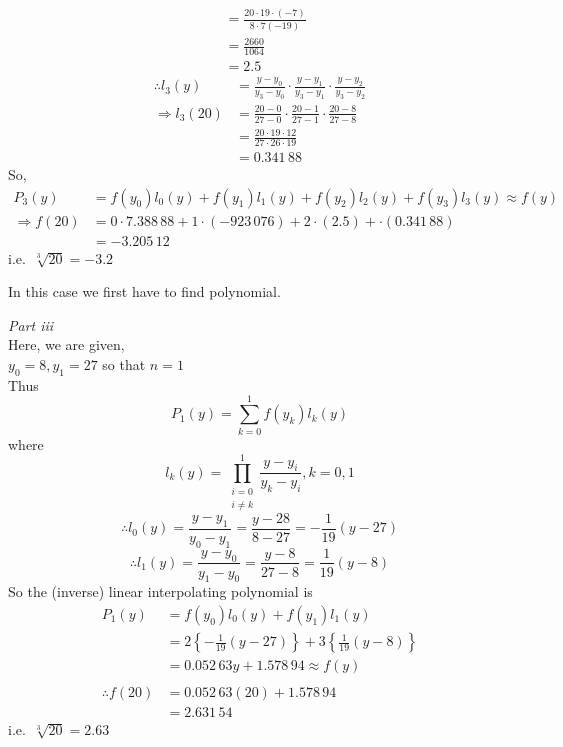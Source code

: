 \documentclass[12pt,class=book,crop=false]{standalone}
\begin{document}
\begin{soln}
\begin{align*}
                            & = \frac{20\cdot19\cdot(-7)}{8\cdot7(-19)}                                   \\
                            & =\frac{2660}{1064}                                                          \\
                            & =2.5
    \end{align*}
    \begin{align*}
        \therefore l_3(y)   & = \frac{y-y_0}{y_3-y_0}\cdot\frac{y-y_1}{y_3-y_1}\cdot\frac{y-y_2}{y_3-y_2} \\
        \Rightarrow l_3(20) & = \frac{20-0}{27-0}\cdot\frac{20-1}{27-1}\cdot\frac{20-8}{27-8}             \\
                            & = \frac{20\cdot19\cdot12}{27\cdot26\cdot19}                                 \\
                            & =0.341\,88
    \end{align*}
    So,
    \begin{align*}
        P_3(y)            & = f(y_0)l_0(y)+f(y_1)l_1(y)+f(y_2)l_2(y)+f(y_3)l_3(y) \approx f(y) \\
        \Rightarrow f(20) & = 0\cdot7.388\,88+1\cdot(-923\,076)+2\cdot(2.5)+\cdot(0.341\,88)         \\
                          & =-3.205\,12
    \end{align*}
    i.e.\ \(  \sqrt[3]{20}=-3.2 \)\\
    \begin{note}
        In this case we first have to find polynomial.
    \end{note}
    \emph{Part iii}\\
    Here, we are given,\\
    \indent \(  y_0=8,y_1=27\) so that \(  n=1 \)\\
    Thus
    \[
        P_1(y)=\sum_{k=0}^1f(y_k)l_k(y)
    \]
    where
    \[
        l_k(y)=\prod_{\substack{i=0\\ i\neq k}}^1\frac{y-y_i}{y_k-y_i}, k=0,1
    \]
    \[\therefore l_0(y) = \frac{y-y_1}{y_0-y_1}=\frac{y-28}{8-27}=-\frac{1}{19}(y-27)\]
    \[\therefore l_1(y) = \frac{y-y_0}{y_1-y_0}=\frac{y-8}{27-8}=\frac{1}{19}(y-8)\]
    So the (inverse) linear interpolating polynomial is
    \begin{align*}
        P_1(y)           & = f(y_0)l_0(y)+f(y_1)l_1(y)                                            \\
                         & =2\left\{-\frac{1}{19}(y-27)\right\}+3\left\{\frac{1}{19}(y-8)\right\} \\
                         & =0.052\,63y+1.578\,94\approx f(y)                                          \\
                         &                                                                        \\
        \therefore f(20) & = 0.052\,63(20)+1.578\,94                                                  \\
                         & =2.631\,54
    \end{align*}
    i.e.\ \(  \sqrt[3]{20}=2.63 \)
\end{soln}
\end{document}
